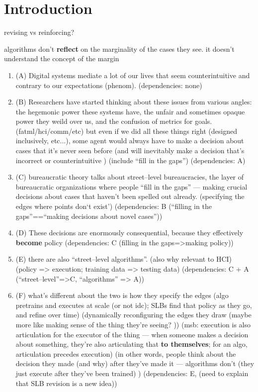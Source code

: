 \documentclass[main]{subfiles}
\begin{document}
\section{Introduction}



revising vs reinforcing?

algorithms don't \textbf{reflect} on the marginality of the cases they see.
it doesn't understand the concept of the margin

\begin{enumerate}
  \item (A) {Digital systems mediate a lot of our lives that seem counterintuitive and contrary to our expectations} (phenom).
      (dependencies: none)

  \item (B) {Researchers have started thinking about these issues from various angles: the hegemonic power these systems have, the unfair and sometimes opaque power they weild over us, and the confusion of metrics for goals.} (fatml/hci/comm/etc) but even if we did all these things right (designed inclusively, etc...), some agent would always have to make a decision about cases that it's never seen before (and will inevitably make a decision that's incorrect or counterintuitive ) (include ``fill in the gaps'')
      (dependencies: A)
  
  \item (C) {bureaucratic theory talks about street--level bureaucracies, the layer of bureaucratic organizations where people ``fill in the gaps'' --- making crucial decisions about cases that haven't been spelled out already.} (specifying the edges where points don`t exist')
      (dependencies: B (``filling in the gaps''==``making decisions about novel cases''))

  \item (D) These decisions are enormously consequential, because they effectively \textbf{become} policy
      (dependencies: C (filling in the gaps=>making policy))
  
  \item (E) there are also ``street--level algorithms''. (also why relevant to HCI) (policy => execution; training data => testing data)
      (dependencies: C + A (``street--level''=>C, ``algorithms'' => A))
  
  \item (F) what's different about the two is how they specify the edges (algo pretrains and executes at scale (or not idc); SLBs find that policy as they go, and refine over time) (dynamically reconfiguring the edges they draw (maybe more like making sense of the thing they're seeing? )) (msb: execution is also articulation for the executor of the thing --- when someone makes a decision about something, they're also articulating that \textbf{to themselves}; for an algo, articulation precedes execution) (in other words, people think about the decision they made (and why) after they've made it --- algorithms don't (they just execute after they've been trained) )
      (dependencies: E, (need to explain that SLB revision is a new idea))
  

\end{enumerate}
\end{document}
